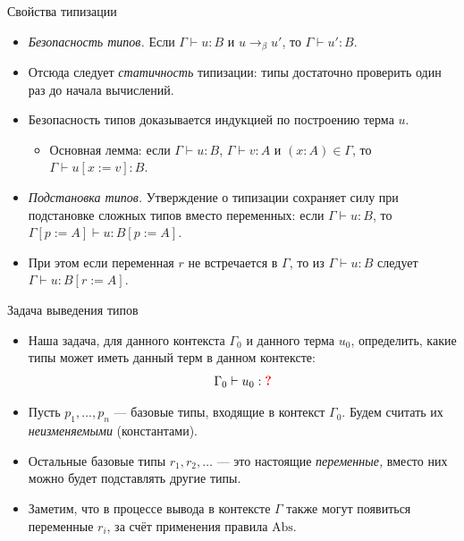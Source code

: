 \documentclass[xcolor=dvipsnames]{beamer}
\begin{document}
\begin{frame}{Свойства типизации}
 
 \begin{itemize}[<+->]
  \item \emph{Безопасность типов.} Если $\Gamma \vdash u: B$ и $u \to_\beta u'$, то $\Gamma \vdash u':B$.
  \item Отсюда следует {\em статичность} типизации: типы достаточно проверить один раз до начала вычислений.
  \item Безопасность типов доказывается индукцией по построению терма $u$.
  \begin{itemize}
    \item Основная лемма: если $\Gamma \vdash u : B$, $\Gamma \vdash v : A$ и $(x : A) \in \Gamma$, то $\Gamma \vdash u[x:=v] : B$.
  \end{itemize}
  \item {\em Подстановка типов.} Утверждение о типизации сохраняет силу при подстановке сложных типов вместо переменных: если $\Gamma \vdash u : B$, то $\Gamma[p:=A] \vdash u : B[p:=A]$.
  \item При этом если переменная $r$ не встречается в $\Gamma$, то из $\Gamma \vdash u: B$ следует $\Gamma \vdash u:B[r:=A]$.
 \end{itemize}

\end{frame}

\begin{frame}{Задача выведения типов}

\begin{itemize}[<+->]
 \item Наша задача, для данного контекста $\Gamma_0$ и данного терма $u_0$, определить, какие типы может иметь данный терм в данном контексте:
 \[
  \Gamma_0 \vdash u_0 : \color{red}{\boldsymbol{?}}
 \]
 \vspace*{-15pt}
 \item Пусть $p_1, \ldots, p_n$ --- базовые типы, входящие в контекст $\Gamma_0$. Будем считать их {\em неизменяемыми} (константами).
 
 \item Остальные базовые типы $r_1, r_2, \ldots$ --- это настоящие {\em переменные,} вместо них можно будет подставлять другие типы.
 
 \item Заметим, что в процессе вывода в контексте $\Gamma$ также могут появиться переменные $r_i$, за счёт применения правила $\mathrm{Abs}$.

\end{itemize}

 
\end{frame}
\end{document}
